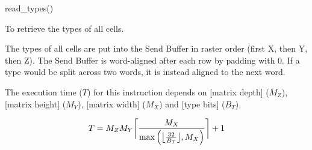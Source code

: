 

\format

read\_types()

\purpose

To retrieve the types of all cells.

\description

The types of all cells are put into the Send Buffer in raster order (first X, then Y, then Z).
The Send Buffer is word-aligned after each row by padding with 0.
If a type would be split across two words, it is instead aligned to the next word.

\notes

The execution time ($T$) for this instruction depends on [matrix depth] ($M_Z$), [matrix height] ($M_Y$), [matrix width] ($M_X$) and [type bits] ($B_T$).

$$ T = M_Z M_Y \ceil[\bigg]{ \frac{M_X}{\max \left( \floor[\big]{ \frac{32}{B_T} }, M_X \right)} } + 1 $$
